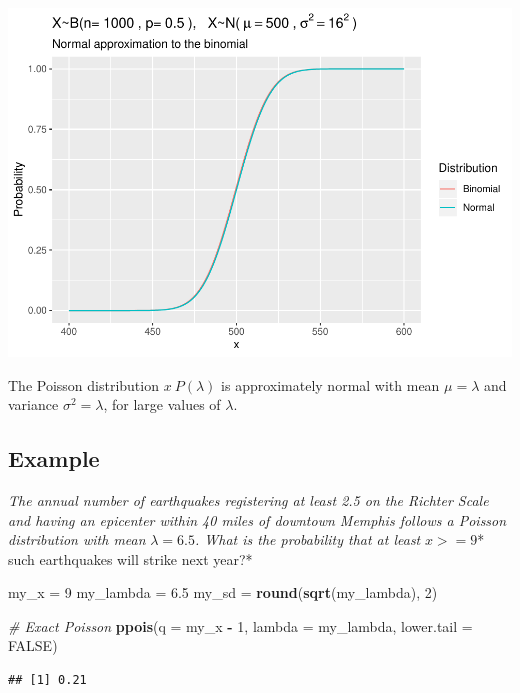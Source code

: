 \documentclass[
]{book}
\newenvironment{Shaded}{\begin{snugshade}}{\end{snugshade}}
\newcommand{\CommentTok}[1]{\textcolor[rgb]{0.56,0.35,0.01}{\textit{#1}}}
\newcommand{\DataTypeTok}[1]{\textcolor[rgb]{0.13,0.29,0.53}{#1}}
\newcommand{\DecValTok}[1]{\textcolor[rgb]{0.00,0.00,0.81}{#1}}
\newcommand{\FloatTok}[1]{\textcolor[rgb]{0.00,0.00,0.81}{#1}}
\newcommand{\KeywordTok}[1]{\textcolor[rgb]{0.13,0.29,0.53}{\textbf{#1}}}
\newcommand{\NormalTok}[1]{#1}
\newcommand{\OperatorTok}[1]{\textcolor[rgb]{0.81,0.36,0.00}{\textbf{#1}}}
\newcommand{\OtherTok}[1]{\textcolor[rgb]{0.56,0.35,0.01}{#1}}
\newcommand{\StringTok}[1]{\textcolor[rgb]{0.31,0.60,0.02}{#1}}
\begin{document}
\includegraphics{data-sci_files/figure-latex/unnamed-chunk-25-1.pdf}

The Poisson distribution \(x~P(\lambda)\) is approximately normal with mean \(\mu = \lambda\) and variance \(\sigma^2 = \lambda\), for large values of \(\lambda\).

\hypertarget{example-15}{%
\subsection{Example}\label{example-15}}

\emph{The annual number of earthquakes registering at least 2.5 on the Richter Scale and having an epicenter within 40 miles of downtown Memphis follows a Poisson distribution with mean }\(\lambda=6.5\)\emph{. What is the probability that at least }\(x>=9\)* such earthquakes will strike next year?*

\begin{Shaded}
\begin{Highlighting}[]
\NormalTok{my_x =}\StringTok{ }\DecValTok{9}
\NormalTok{my_lambda =}\StringTok{ }\FloatTok{6.5}
\NormalTok{my_sd =}\StringTok{ }\KeywordTok{round}\NormalTok{(}\KeywordTok{sqrt}\NormalTok{(my_lambda), }\DecValTok{2}\NormalTok{)}

\CommentTok{# Exact Poisson}
\KeywordTok{ppois}\NormalTok{(}\DataTypeTok{q =}\NormalTok{ my_x }\OperatorTok{-}\StringTok{ }\DecValTok{1}\NormalTok{, }\DataTypeTok{lambda =}\NormalTok{ my_lambda, }\DataTypeTok{lower.tail =} \OtherTok{FALSE}\NormalTok{)}
\end{Highlighting}
\end{Shaded}

\begin{verbatim}
## [1] 0.21
\end{verbatim}
\end{document}
